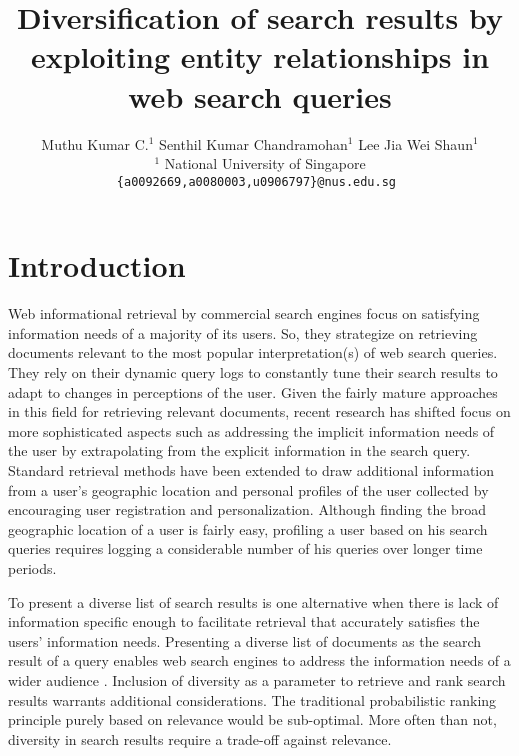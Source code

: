 \documentclass[11pt]{article}
\title{Diversification of search results by exploiting entity relationships in
web search queries}
\author{Muthu Kumar C.$^{1}$ \hspace{1.1cm}  Senthil Kumar Chandramohan$^{1}$ \hspace{1.1cm} Lee Jia Wei Shaun$^{1}$ \\
 {$^{1}$ National University of Singapore }\\
 {\tt \{a0092669,a0080003,u0906797\}@nus.edu.sg }%
 }
\date{}
\begin{document}
\maketitle
\begin{abstract}
 
\end{abstract}


\section{Introduction}
\label{intro}
Web informational retrieval by commercial search engines focus on 
satisfying information needs of a majority of its users. So, they 
strategize on retrieving documents relevant to the most popular interpretation(s) 
of web search queries. They rely on their dynamic query logs to constantly tune 
their search results to adapt to changes in perceptions of the user. Given 
the fairly mature approaches in this field for retrieving relevant documents, 
recent research has shifted focus on more sophisticated aspects such as addressing 
the implicit information needs of the user by extrapolating from the explicit 
information in the search query. Standard retrieval methods have been extended to 
draw additional information from a user's geographic location \cite{lu2010personalize} 
and personal profiles of the user \cite{teevan2005personalizing} collected by 
encouraging user registration and personalization. Although finding the broad 
geographic location of a user is fairly easy, profiling a user based on his search 
queries requires logging a considerable number of his queries over longer time periods.

To present a diverse list of search results is one alternative when there is lack 
of information specific enough to facilitate retrieval that accurately satisfies the 
users' information needs. Presenting a diverse list of documents as the search result 
of a query enables web search engines to address the information needs of a wider 
audience \cite{bhatia2012analysis}. Inclusion of diversity as a parameter to retrieve 
and rank search results warrants additional considerations. The traditional probabilistic 
ranking principle purely based on relevance would be sub-optimal\cite{gollapudi2009axiomatic}. 
More often than not, diversity in search results require a trade-off against relevance.
\end{document}
